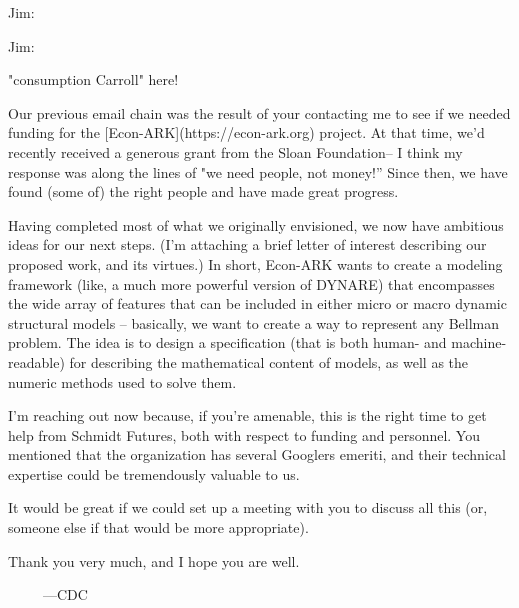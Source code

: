 \documentclass[12pt,pdftex,letterpaper]{article}
\begin{document}
	\pagestyle{empty}
	
Jim:

Jim:

"consumption Carroll" here!

Our previous email chain was the result of your contacting me to see if we needed funding for the [Econ-ARK](https://econ-ark.org) project.  At that time, we'd recently received a generous grant from the Sloan Foundation-- I think my response was along the lines of  "we need people, not money!''  Since then, we have found (some of) the right people and have made great progress.   

Having completed most of what we originally envisioned, we now have ambitious ideas for our next steps. (I'm attaching a brief letter of interest describing our proposed work, and its virtues.)  In short, Econ-ARK wants to create a modeling framework (like, a much more powerful version of DYNARE) that encompasses the wide array of features that can be included in either micro or macro dynamic structural models -- basically, we want to create a way to represent any Bellman problem.  The idea is to design a specification (that is both human- and machine-readable) for describing the mathematical content of models, as well as the numeric methods used to solve them.

I'm reaching out now because, if you're amenable, this is the right time to get help from Schmidt Futures, both with respect to funding and personnel. You mentioned that the organization has several Googlers emeriti, and their technical expertise could be tremendously valuable to us.  

It would be great if we could set up a meeting with you to discuss all this (or, someone else if that would be more appropriate).

Thank you very much, and I hope you are well.

~~~~~---CDC
\end{document}
